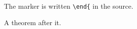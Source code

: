 \documentclass{article}
\begin{document}
\begin{theorem}\label{thm:verb}
The marker is written \verb|\end{| in the source.
\end{theorem}

\begin{theorem}\label{thm:next}
A theorem after it.
\end{theorem}
\end{document}
